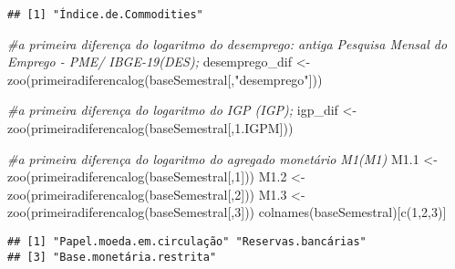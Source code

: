\documentclass[
]{article}
\newenvironment{Shaded}{\begin{snugshade}}{\end{snugshade}}
\newcommand{\CommentTok}[1]{\textcolor[rgb]{0.56,0.35,0.01}{\textit{#1}}}
\newcommand{\DecValTok}[1]{\textcolor[rgb]{0.00,0.00,0.81}{#1}}
\newcommand{\FloatTok}[1]{\textcolor[rgb]{0.00,0.00,0.81}{#1}}
\newcommand{\FunctionTok}[1]{\textcolor[rgb]{0.00,0.00,0.00}{#1}}
\newcommand{\NormalTok}[1]{#1}
\newcommand{\OtherTok}[1]{\textcolor[rgb]{0.56,0.35,0.01}{#1}}
\newcommand{\StringTok}[1]{\textcolor[rgb]{0.31,0.60,0.02}{#1}}
\begin{document}
\begin{verbatim}
## [1] "Índice.de.Commodities"
\end{verbatim}

\begin{Shaded}
\begin{Highlighting}[]
\CommentTok{\#a primeira diferença do logaritmo do desemprego: antiga Pesquisa Mensal do Emprego {-} PME/ IBGE{-}19(DES);}
\NormalTok{desemprego\_dif }\OtherTok{\textless{}{-}} \FunctionTok{zoo}\NormalTok{(}\FunctionTok{primeiradiferencalog}\NormalTok{(baseSemestral[,}\StringTok{"desemprego"}\NormalTok{]))}

\CommentTok{\#a primeira diferença do logaritmo do IGP (IGP);}
\NormalTok{igp\_dif }\OtherTok{\textless{}{-}} \FunctionTok{zoo}\NormalTok{(}\FunctionTok{primeiradiferencalog}\NormalTok{(baseSemestral[,}\StringTok{\textquotesingle{}1.IGPM\textquotesingle{}}\NormalTok{]))}

\CommentTok{\#a primeira diferença do logaritmo do agregado monetário M1(M1)}
\NormalTok{M1}\FloatTok{.1} \OtherTok{\textless{}{-}} \FunctionTok{zoo}\NormalTok{(}\FunctionTok{primeiradiferencalog}\NormalTok{(baseSemestral[,}\DecValTok{1}\NormalTok{]))}
\NormalTok{M1}\FloatTok{.2} \OtherTok{\textless{}{-}} \FunctionTok{zoo}\NormalTok{(}\FunctionTok{primeiradiferencalog}\NormalTok{(baseSemestral[,}\DecValTok{2}\NormalTok{]))}
\NormalTok{M1}\FloatTok{.3} \OtherTok{\textless{}{-}} \FunctionTok{zoo}\NormalTok{(}\FunctionTok{primeiradiferencalog}\NormalTok{(baseSemestral[,}\DecValTok{3}\NormalTok{]))}
\FunctionTok{colnames}\NormalTok{(baseSemestral)[}\FunctionTok{c}\NormalTok{(}\DecValTok{1}\NormalTok{,}\DecValTok{2}\NormalTok{,}\DecValTok{3}\NormalTok{)]}
\end{Highlighting}
\end{Shaded}

\begin{verbatim}
## [1] "Papel.moeda.em.circulação" "Reservas.bancárias"       
## [3] "Base.monetária.restrita"
\end{verbatim}
\end{document}
